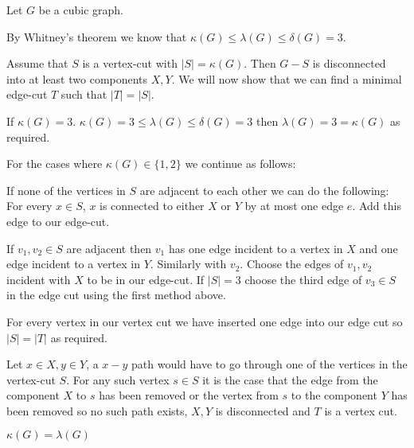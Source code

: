 Let $G$ be a cubic graph. 

By Whitney's theorem we know that $\kappa(G) \le \lambda(G) \le \delta(G) = 3 $.

Assume that $S$ is a vertex-cut with $|S| = \kappa(G)$. Then
$G-S$ is disconnected into at least two components $X, Y$. 
We will now show that we can find a minimal edge-cut $T$ such that $|T| = |S|$.

If $\kappa(G) = 3$. $\kappa(G) = 3 \le \lambda(G) \le \delta(G) = 3$
then $\lambda(G) = 3 = \kappa(G)$ as required.

For the cases where $\kappa(G) \in \{1, 2\}$ we continue as follows:

If none of the vertices in $S$ are adjacent to each other we can do the following:
For every $x \in S$, $x$ is connected to either $X$ or $Y$ by at most one edge $e$. 
Add this edge to our edge-cut.

If $v_1, v_2 \in S$ are adjacent then $v_1$ has one edge incident to a vertex 
in $X$ and one edge incident to a vertex in $Y$. Similarly with $v_2$. Choose 
the edges of $v_1, v_2$ incident with $X$ to be in our edge-cut. If $|S| = 3$ 
choose the third edge of $v_3 \in S$ in the edge cut using the first method 
above. 


For every vertex in our vertex cut we have inserted one edge into our edge
cut so $|S| = |T|$ as required. 

Let $x\in X, y \in Y$, a $x-y$ path would have to go through one of the
vertices in the vertex-cut $S$. For any such vertex $s \in S$ it is the
case that the edge from the component $X$ to $s$ has been removed or the
vertex from $s$ to the component $Y$ has been removed so no such path
exists, $X, Y$ is disconnected and $T$ is a vertex cut. 

$\kappa(G) = \lambda(G)$
